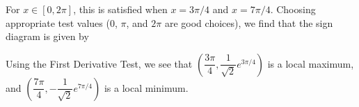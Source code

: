 \documentclass[12pt]{article}
\begin{document}
\begin{enumerate}
 For $x\in [0,2\pi]$, this is satisfied when $x=3\pi/4$ and $x=7\pi/4$. Choosing appropriate test values ($0$, $\pi$, and $2\pi$ are good choices), we find that the sign diagram is given by
 \begin{center}
\end{center}
Using the First Derivative Test, we see that $\left(\dfrac{3\pi}{4},\dfrac{1}{\sqrt{2}}e^{3\pi/4}\right)$ is a local maximum, and $\left(\dfrac{7\pi}{4},-\dfrac{1}{\sqrt{2}}e^{7\pi/4}\right)$ is a local minimum.
\end{enumerate}
\end{document}
